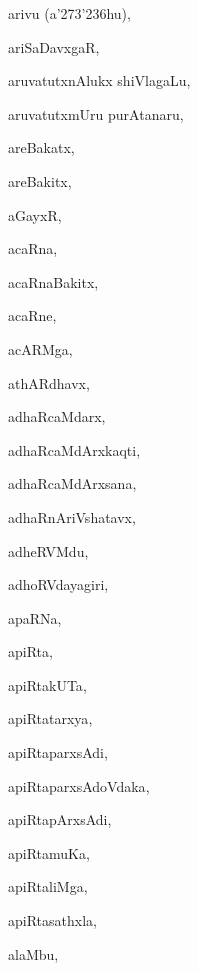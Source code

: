 \begin{multicols}{3}
{\noindent
{arivu (a\char'273\char'236hu)}, \pageref{arivu (a273236hu)}

\noindent
{ariSaDavxgaR}, \pageref{ariSaDavxgaR}

\noindent
{aruvatutxnAlukx shiVlagaLu}, \pageref{aruvatutxnAlukx shiVlagaLu}

\noindent
{aruvatutxmUru purAtanaru}, \pageref{aruvatutxmUru purAtanaru}

\noindent
{areBakatx}, \pageref{areBakatx}

\noindent
{areBakitx}, \pageref{areBakitx}

\noindent
{aGayxR}, \pageref{aGayxR}

\noindent
{acaRna}, \pageref{acaRna}

\noindent
{acaRnaBakitx}, \pageref{acaRnaBakitx}

\noindent
{acaRne}, \pageref{acaRne}

\noindent
{acARMga}, \pageref{acARMga}

\noindent
{athARdhavx}, \pageref{athARdhavx}

\noindent
{adhaRcaMdarx}, \pageref{adhaRcaMdarx}

\noindent
{adhaRcaMdArxkaqti}, \pageref{adhaRcaMdArxkaqti}

\noindent
{adhaRcaMdArxsana}, \pageref{adhaRcaMdArxsana}

\noindent
{adhaRnAriVshatavx}, \pageref{adhaRnAriVshatavx}

\noindent
{adheRVMdu}, \pageref{adheRVMdu}

\noindent
{adhoRVdayagiri}, \pageref{adhoRVdayagiri}

\noindent
{apaRNa}, \pageref{apaRNa}

\noindent
{apiRta}, \pageref{apiRta}

\noindent
{apiRtakUTa}, \pageref{apiRtakUTa}

\noindent
{apiRtatarxya}, \pageref{apiRtatarxya}

\noindent
{apiRtaparxsAdi}, \pageref{apiRtaparxsAdi}

\noindent
{apiRtaparxsAdoVdaka}, \pageref{apiRtaparxsAdoVdaka}

\noindent
{apiRtapArxsAdi}, \pageref{apiRtapArxsAdi}

\noindent
{apiRtamuKa}, \pageref{apiRtamuKa}

\noindent
{apiRtaliMga}, \pageref{apiRtaliMga}

\noindent
{apiRtasathxla}, \pageref{apiRtasathxla}

\noindent
{alaMbu}, \pageref{alaMbu}

}
\end{multicols}
